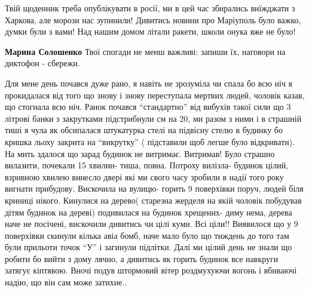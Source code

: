  
 
 
 
 

\qqSecCmt


Твій щоденник треба опублікувати в росії, ми в цей час збирались виїжджати з
Харкова, але морози нас зупинили! Дивитись новини про Маріуполь було важко,
думки були з вами! Над нашим домом літали ракети, школи онука вже не було!

\begin{itemize} %
\textbf{Марина Солошенко} Твої спогади не менш важливі: запиши їх, наговори на диктофон - сбережи.
\end{itemize} %


Для мене день почався дуже рано, я навіть не зрозуміла чи спала бо всю ніч я
прокидалася від того що знову і знову переступала мертвих людей, чоловік казав,
що стогнала всю ніч. Ранок почався \enquote{стандартно} від вибухів такої сили що 3
літрові банки з закрутками підстрибнули см на 20, ми разом з ними і в страшній
тиші я чула як обсипалася штукатурка стелі на підвісну стелю в будинку бо
кришка льоху закрита на \enquote{викрутку} ( підставили щоб легше було відкривати). На
мить здалося що зарад будинок не витримає. Витримав! Було страшно вилазити,
почекали 15 хвилин- тиша, повна. Потроху вилізла- будинок цілий, взривною
хвилею винесло двері які ми свого часу зробили в надії того року вигнати
прибудову. Вискочила на вулицю- горить 9 поверхівки поруч, людей біля криниці
нікого. Кинулися на дерево( старезна жерделя на якій чоловік побудував дітям
будинок на дереві) подивилася на будинок хрещених- диму нема, дерева наче не
посічені, вискочили дивитись чи цілі куми. Всі ціли!! Виявилося що у 9
поверхівки скинули кілька авіа бомб, наче мало було що тиждень до того там були
прильоти точок \enquote{У} і загинули підлітки. Далі ми цілий день не знали що робити
бо вийти з дому лячно, а дивитись як горить будинок все навкруги затягує
кіптявою. Вночі подув штормовий вітер роздмухуючи вогонь і вбиваючі надію, що
він сам може затихне..

